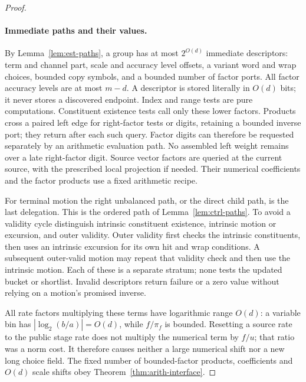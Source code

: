 \documentclass[11pt]{article}
\numberwithin{equation}{section}
\theoremstyle{definition}
\theoremstyle{remark}
\begin{document}
\begin{proof}
\paragraph{Immediate paths and their values.}
By Lemma~\ref{lem:est-paths}, a group has at most $2^{O(d)}$ immediate
descriptors: term and channel part, scale and accuracy level offsets, a variant
word and wrap choices, bounded copy symbols, and a bounded number of
factor ports.  All factor accuracy levels are at most ${m}-d$.  A descriptor is
stored literally in $O(d)$ bits; it never stores a discovered endpoint.
Index and range tests are pure computations.  Constituent existence
tests call only these lower factors.  Products cross a paired left
edge for right-factor tests or digits, retaining a bounded inverse
port; they return after each such query.  Factor digits can therefore be
requested separately by an arithmetic evaluation path.  No assembled
left weight remains over a late right-factor digit.  Source vector
factors are queried at the current source, with the prescribed local
projection if needed.  Their numerical coefficients and the factor
products use a fixed arithmetic recipe.

For terminal motion the right unbalanced path, or the direct child
path, is the last delegation.  This is the ordered path of
Lemma~\ref{lem:ctrl-paths}.  To avoid a validity cycle distinguish
intrinsic constituent existence, intrinsic motion or excursion, and
outer validity.  Outer validity first checks the intrinsic constituents,
then uses an intrinsic excursion for its own hit and wrap conditions.
A subsequent outer-valid motion may repeat that validity check and
then use the intrinsic motion.  Each of these is a separate stratum;
none tests the updated bucket or shortlist.  Invalid descriptors return
failure or a zero value without relying on a motion's promised inverse.

All rate factors multiplying these terms have logarithmic range
$O(d)$: a variable bin has $|\log_2(b/a)|=O(d)$, while $f/\pi_f$ is
bounded.  Resetting a source rate to the public stage rate does not
multiply the numerical term by $f/u$; that ratio was a norm cost.
It therefore causes neither a large numerical shift nor a new long
choice field.  The fixed number of bounded-factor products, coefficients
and $O(d)$ scale shifts obey Theorem~\ref{thm:arith-interface}.


\end{proof}
\end{document}
